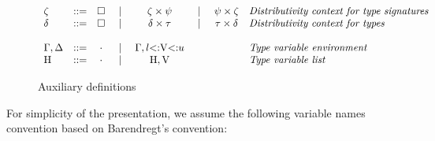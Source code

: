 \begin{figure}
\footnotesize
\[
\begin{array}{lccccccl}
    \zeta &::=& \square &
        ~\vert~& \zeta \times \psi &
        ~\vert~& \psi \times \zeta &
        \textit{Distributivity context for type signatures}
    \\
    \delta &::=& \square &
        ~\vert~& \delta \times \tau &
        ~\vert~& \tau \times \delta &
        \textit{Distributivity context for types}
    \\
    \\
    \Gamma, \Delta &::=& \cdot &
        ~\vert~& \Gamma, l{\operatorname{<:}}\mathrm{V}{\operatorname{<:}}u &
        & & 
        \textit{Type variable environment}
    \\
    \mathrm{H} &::=& \cdot &
        ~\vert~& \mathrm{H}, \mathrm{V} &
        & & 
        \textit{Type variable list}
\end{array}
\]
\caption{Auxiliary definitions}\label{fig:subty-aux}
\end{figure}



For simplicity of the presentation, we assume the following variable names 
convention based on Barendregt's convention:

